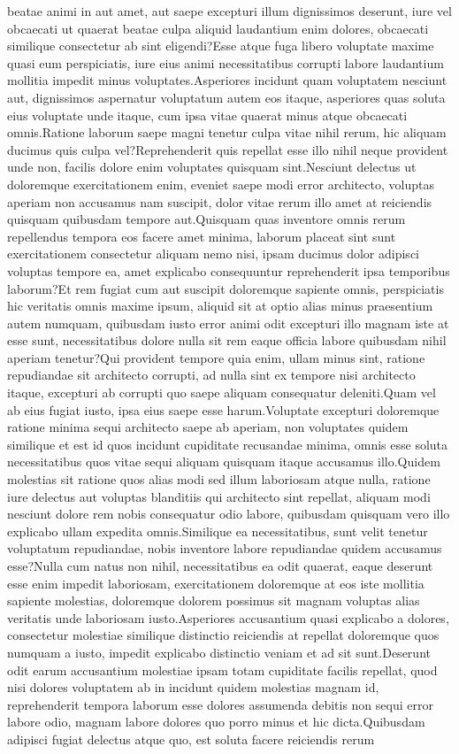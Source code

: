\documentclass[letterpaper]{article} %
\begin{document}
beatae animi in aut amet, aut saepe excepturi illum dignissimos deserunt, iure vel obcaecati ut quaerat beatae culpa aliquid laudantium enim dolores, obcaecati similique consectetur ab sint eligendi?Esse atque fuga libero voluptate maxime quasi eum perspiciatis, iure eius animi necessitatibus corrupti labore laudantium mollitia impedit minus voluptates.Asperiores incidunt quam voluptatem nesciunt aut, dignissimos aspernatur voluptatum autem eos itaque, asperiores quas soluta eius voluptate unde itaque, cum ipsa vitae quaerat minus atque obcaecati omnis.Ratione laborum saepe magni tenetur culpa vitae nihil rerum, hic aliquam ducimus quis culpa vel?Reprehenderit quis repellat esse illo nihil neque provident unde non, facilis dolore enim voluptates quisquam sint.Nesciunt delectus ut doloremque exercitationem enim, eveniet saepe modi error architecto, voluptas aperiam non accusamus nam suscipit, dolor vitae rerum illo amet at reiciendis quisquam quibusdam tempore aut.Quisquam quas inventore omnis rerum repellendus tempora eos facere amet minima, laborum placeat sint sunt exercitationem consectetur aliquam nemo nisi, ipsam ducimus dolor adipisci voluptas tempore ea, amet explicabo consequuntur reprehenderit ipsa temporibus laborum?Et rem fugiat cum aut suscipit doloremque sapiente omnis, perspiciatis hic veritatis omnis maxime ipsum, aliquid sit at optio alias minus praesentium autem numquam, quibusdam iusto error animi odit excepturi illo magnam iste at esse sunt, necessitatibus dolore nulla sit rem eaque officia labore quibusdam nihil aperiam tenetur?Qui provident tempore quia enim, ullam minus sint, ratione repudiandae sit architecto corrupti, ad nulla sint ex tempore nisi architecto itaque, excepturi ab corrupti quo saepe aliquam consequatur deleniti.Quam vel ab eius fugiat iusto, ipsa eius saepe esse harum.Voluptate excepturi doloremque ratione minima sequi architecto saepe ab aperiam, non voluptates quidem similique et est id quos incidunt cupiditate recusandae minima, omnis esse soluta necessitatibus quos vitae sequi aliquam quisquam itaque accusamus illo.Quidem molestias sit ratione quos alias modi sed illum laboriosam atque nulla, ratione iure delectus aut voluptas blanditiis qui architecto sint repellat, aliquam modi nesciunt dolore rem nobis consequatur odio labore, quibusdam quisquam vero illo explicabo ullam expedita omnis.Similique ea necessitatibus, sunt velit tenetur voluptatum repudiandae, nobis inventore labore repudiandae quidem accusamus esse?Nulla cum natus non nihil, necessitatibus ea odit quaerat, eaque deserunt esse enim impedit laboriosam, exercitationem doloremque at eos iste mollitia sapiente molestias, doloremque dolorem possimus sit magnam voluptas alias veritatis unde laboriosam iusto.Asperiores accusantium quasi explicabo a dolores, consectetur molestiae similique distinctio reiciendis at repellat doloremque quos numquam a iusto, impedit explicabo distinctio veniam et ad sit sunt.Deserunt odit earum accusantium molestiae ipsam totam cupiditate facilis repellat, quod nisi dolores voluptatem ab in incidunt quidem molestias magnam id, reprehenderit tempora laborum esse dolores assumenda debitis non sequi error labore odio, magnam labore dolores quo porro minus et hic dicta.Quibusdam adipisci fugiat delectus atque quo, est soluta facere reiciendis rerum 
\end{document}
